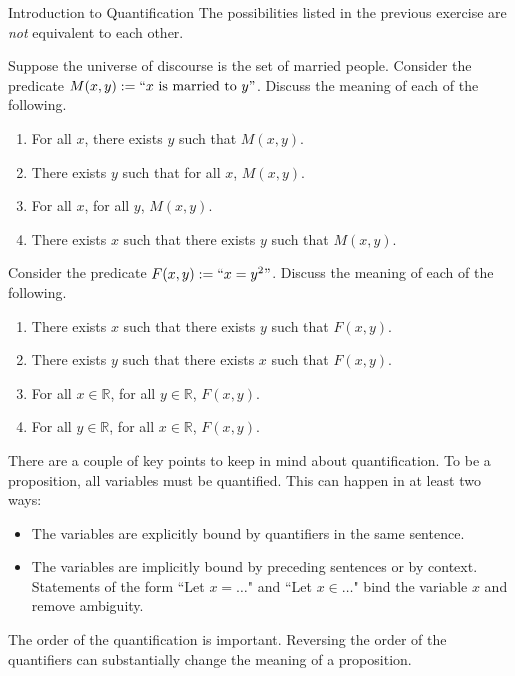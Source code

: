 \begin{section}{Introduction to Quantification}
The possibilities listed in the previous exercise are \emph{not} equivalent to each other.

\begin{exercise}
Suppose the universe of discourse is the set of married people.  Consider the predicate $M(x,y):=``x\mbox{ is married to }y"$.  Discuss the meaning of each of the following.
\begin{enumerate}[label=\textrm{(\alph*)}]
\item For all $x$, there exists $y$ such that $M(x,y)$.
\item There exists $y$ such that for all $x$, $M(x,y)$.
\item For all $x$, for all $y$, $M(x,y)$.
\item There exists $x$ such that there exists $y$ such that $M(x,y)$.
\end{enumerate}
\end{exercise}

\begin{exercise}
Consider the predicate $F(x,y):=``x=y^2"$.  Discuss the meaning of each of the following.
\begin{enumerate}[label=\textrm{(\alph*)}]
\item There exists $x$ such that there exists $y$ such that $F(x,y)$.
\item There exists $y$ such that there exists $x$ such that $F(x,y)$.
\item For all $x\in \mathbb{R}$, for all $y\in\mathbb{R}$, $F(x,y)$.
\item For all $y\in \mathbb{R}$, for all $x\in\mathbb{R}$, $F(x,y)$.
\end{enumerate}
\end{exercise}


There are a couple of key points to keep in mind about quantification. To be a proposition, all variables must be quantified.  This can happen in at least two ways:
\begin{itemize}
\item The variables are explicitly bound by quantifiers in the same sentence.
\item The variables are implicitly bound by preceding sentences or by context. Statements of the form ``Let $x=\ldots$" and ``Let $x\in\ldots$" bind the variable $x$ and remove ambiguity.
\end{itemize}
The order of the quantification is important.  Reversing the order of the quantifiers can substantially change the meaning of a proposition.


\end{section}
